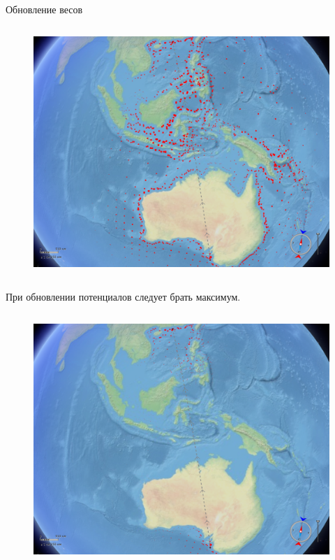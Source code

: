 \documentclass[russian, hyperref={unicode}]{beamer}
\theoremstyle{definition}
\begin{document}
\begin{frame}{Обновление весов}
{\begin{columns}
            \begin{figure}
                \includegraphics[clip=true, trim = 280pt 0 20pt 0, width=\textwidth]{potentials-update/max2}
            \end{figure}
        \end{columns}

        \begin{center}
            При обновлении потенциалов следует брать максимум.
        \end{center}
    }
   
     {
        \begin{columns}
            \begin{figure}
                \includegraphics[clip=true, trim = 280pt 0 20pt 0, width=\textwidth]{potentials-update/accum3}
            \end{figure}


\end{columns}}
\end{frame}
\end{document}

